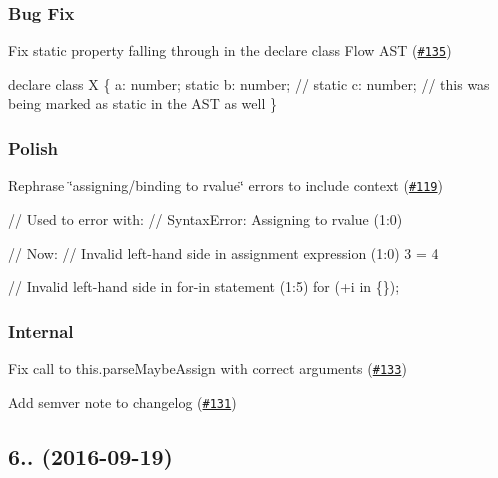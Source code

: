 \subsubsection*{Bug Fix}


\begin{DoxyItemize}
\item Fix {\ttfamily static} property falling through in the declare class Flow A\+ST (\href{https://github.com/babel/babylon/pull/135}{\tt \#135}) 
\end{DoxyItemize}


\begin{DoxyCode}
declare class X \{
    a: number;
    static b: number; // static
    c: number; // this was being marked as static in the AST as well
\}
\end{DoxyCode}


\subsubsection*{Polish}


\begin{DoxyItemize}
\item Rephrase \char`\"{}assigning/binding to rvalue\char`\"{} errors to include context (\href{https://github.com/babel/babylon/pull/119}{\tt \#119}) 
\end{DoxyItemize}


\begin{DoxyCode}
// Used to error with:
// SyntaxError: Assigning to rvalue (1:0)

// Now:
// Invalid left-hand side in assignment expression (1:0)
3 = 4

// Invalid left-hand side in for-in statement (1:5)
for (+i in \{\});
\end{DoxyCode}


\subsubsection*{Internal}


\begin{DoxyItemize}
\item Fix call to {\ttfamily this.\+parse\+Maybe\+Assign} with correct arguments (\href{https://github.com/babel/babylon/pull/133}{\tt \#133}) 
\item Add semver note to changelog (\href{https://github.com/babel/babylon/pull/131}{\tt \#131}) 
\end{DoxyItemize}

\subsection*{6.. (2016-\/09-\/19)}

